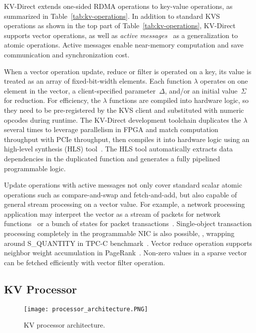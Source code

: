 KV-Direct extends one-sided RDMA operations to key-value operations, as summarized in Table~\ref{tab:kv-operations}.
In addition to standard KVS operations as shown in the top part of Table~\ref{tab:kv-operations}, KV-Direct supports vector operations, as well as \textit{active messages}~\cite{eicken1992active} as a generalization to atomic operations.
Active messages enable near-memory computation and save communication and synchronization cost.

When a vector operation update, reduce or filter is operated on a key, its value is treated as an array of fixed-bit-width elements.
Each function $\lambda$ operates on one element in the vector, a client-specified parameter~$\Delta$, and/or an initial value~$\Sigma$ for reduction.
For efficiency, the $\lambda$ functions are compiled into hardware logic, so they need to be pre-registered by the KVS client and substituted with numeric opcodes during runtime.
The KV-Direct development toolchain duplicates the $\lambda$ several times to leverage parallelism in FPGA and match computation throughput with PCIe throughput, then compiles it into hardware logic using an high-level synthesis (HLS) tool~\cite{aoc}.
The HLS tool automatically extracts data dependencies in the duplicated function and generates a fully pipelined programmable logic.

Update operations with active messages not only cover standard scalar atomic operations such as compare-and-swap and fetch-and-add, but also capable of general stream processing on a vector value.
For example, a network processing application may interpret the vector as a stream of packets for network functions~\cite{li2016clicknp} or a bunch of states for packet transactions~\cite{sivaraman2016packet}.
Single-object transaction processing completely in the programmable NIC is also possible, \eg, wrapping around S\_QUANTITY in TPC-C benchmark~\cite{council2010tpc}.
Vector reduce operation supports neighbor weight accumulation in PageRank~\cite{page1999pagerank}.
Non-zero values in a sparse vector can be fetched efficiently with vector filter operation.

\subsection{KV Processor}
\label{sec:kv-processor}

\begin{figure}[t]
\centering
\texttt{[image: processor\_architecture.PNG]}
\caption{KV processor architecture.}
\label{fig:kvprocessor-arch}
\vspace{-10pt}
\end{figure}

